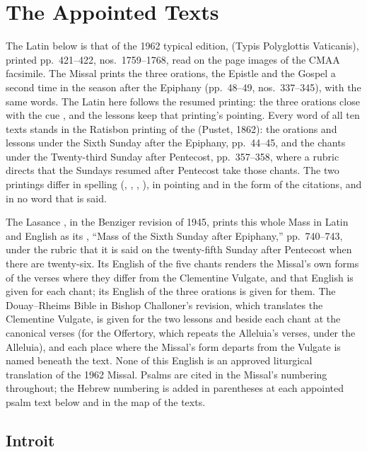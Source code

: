 \section{The Appointed Texts}
\label{sec:appointed-texts}

The Latin below is that of the 1962 typical edition, 
(Typis Polyglottis Vaticanis), printed pp.~421--422, nos.~1759--1768, read on
the page images of the CMAA facsimile. The Missal prints the three orations,
the Epistle and the Gospel a second time in the season after the Epiphany
(pp.~48--49, nos.~337--345), with the same words. The Latin here follows the
resumed printing: the three orations close with the cue ,
and the lessons keep that printing's pointing. Every word of all ten texts
stands in the Ratisbon printing of the  (Pustet, 1862):
the orations and lessons under the Sixth Sunday after the Epiphany,
pp.~44--45, and the chants under the Twenty-third Sunday after Pentecost,
pp.~357--358, where a rubric directs that the Sundays resumed after Pentecost
take those chants. The two printings differ in spelling (,
, , ), in pointing and in the
form of the citations, and in no word that is said.

The Lasance , in the Benziger revision of 1945, prints
this whole Mass in Latin and English as its ,
``Mass of the Sixth Sunday after Epiphany,'' pp.~740--743, under the rubric
that it is said on the twenty-fifth Sunday after Pentecost when there are
twenty-six. Its English of the five chants renders the Missal's own forms of
the verses where they differ from the Clementine Vulgate, and that English is
given for each chant; its English of the three orations is given for them. The
Douay--Rheims Bible in Bishop Challoner's revision, which translates the
Clementine Vulgate, is given for the two lessons and beside each chant at the
canonical verses (for the Offertory, which repeats the Alleluia's verses,
under the Alleluia), and each place where the Missal's form departs from the
Vulgate is named beneath the text. None of this English is an approved
liturgical translation of the 1962 Missal. Psalms are cited in the Missal's
numbering throughout; the Hebrew numbering is added in parentheses at each
appointed psalm text below and in the map of the texts.

\subsection{Introit}
\label{proper-introit}

